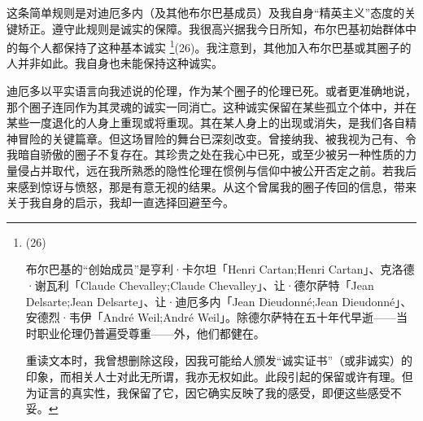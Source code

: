 这条简单规则是对迪厄多内（及其他布尔巴基成员）及我自身“精英主义”态度的关键矫正。遵守此规则是诚实的保障。我很高兴据我今日所知，布尔巴基初始群体中的每个人都保持了这种基本诚实 \footnote{(26) \par 布尔巴基的“创始成员”是亨利·卡尔坦「Henri Cartan;Henri Cartan」、克洛德·谢瓦利「Claude Chevalley;Claude Chevalley」、让·德尔萨特「Jean Delsarte;Jean Delsarte」、让·迪厄多内「Jean Dieudonné;Jean Dieudonné」、安德烈·韦伊「André Weil;André Weil」。除德尔萨特在五十年代早逝——当时职业伦理仍普遍受尊重——外，他们都健在。

重读文本时，我曾想删除这段，因我可能给人颁发“诚实证书”（或非诚实）的印象，而相关人士对此无所谓，我亦无权如此。此段引起的保留或许有理。但为证言的真实性，我保留了它，因它确实反映了我的感受，即便这些感受不妥。}(26)。我注意到，其他加入布尔巴基或其圈子的人并非如此。我自身也未能保持这种诚实。

迪厄多以平实语言向我述说的伦理，作为某个圈子的伦理已死。或者更准确地说，那个圈子连同作为其灵魂的诚实一同消亡。这种诚实保留在某些孤立个体中，并在某些一度退化的人身上重现或将重现。其在某人身上的出现或消失，是我们各自精神冒险的关键篇章。但这场冒险的舞台已深刻改变。曾接纳我、被我视为己有、令我暗自骄傲的圈子不复存在。其珍贵之处在我心中已死，或至少被另一种性质的力量侵占并取代，远在我所熟悉的隐性伦理在惯例与信仰中被公开否定之前。若我后来感到惊讶与愤怒，那是有意无视的结果。从这个曾属我的圈子传回的信息，带来关于我自身的启示，我却一直选择回避至今。